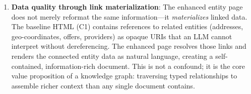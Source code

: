 \documentclass[runningheads]{llncs}
\begin{document}
\begin{enumerate}
    \item \textbf{Data quality through link materialization}:
          The enhanced entity page does not merely reformat the same
          information---it \emph{materializes} linked data.  The
          baseline HTML (C1) contains references to related entities
          (addresses, geo-coordinates, offers, providers) as opaque
          URIs that an LLM cannot interpret without dereferencing.
          The enhanced page resolves those links and renders the
          connected entity data as natural language, creating a
          self-contained, information-rich document.  This is not a
          confound; it is the core value proposition of a
          knowledge graph: traversing typed relationships to assemble
          richer context than any single document contains.


\end{enumerate}
\end{document}
